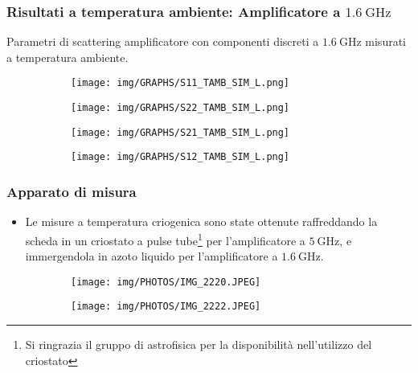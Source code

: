 \documentclass{beamer}
\begin{document}
\begin{frame}
    \frametitle{Risultati a temperatura ambiente: Amplificatore a $\SI{1.6}{\giga\hertz}$}
    Parametri di scattering amplificatore con componenti discreti a $\SI{1.6}{\giga\hertz}$ misurati a temperatura ambiente.
    \begin{figure}[!htbp]
        \centering
        
        \begin{subfigure}[t]{0.4\textwidth}
            \centering
            \texttt{[image: img/GRAPHS/S11\_TAMB\_SIM\_L.png]}
            
        \end{subfigure}
        \hfill
        \begin{subfigure}[t]{0.4\textwidth}
            \centering
            \texttt{[image: img/GRAPHS/S22\_TAMB\_SIM\_L.png]}
            
        \end{subfigure}
        \hfill
        \centering
        \begin{subfigure}[t]{0.4\textwidth}
            \centering
            \texttt{[image: img/GRAPHS/S21\_TAMB\_SIM\_L.png]}
            
        \end{subfigure}
        \hfill
        \begin{subfigure}[t]{0.4\textwidth}
            \centering
            \texttt{[image: img/GRAPHS/S12\_TAMB\_SIM\_L.png]}
            
        \end{subfigure}
    \end{figure}
\end{frame}

\begin{frame}
    \frametitle{Apparato di misura}
    \begin{itemize}
        \item Le misure a temperatura criogenica sono state ottenute raffreddando la scheda in un criostato a pulse tube\footnote{Si ringrazia il gruppo di astrofisica per la disponibilità nell'utilizzo del criostato} per l'amplificatore a $\SI{5}{\giga\hertz}$, e immergendola in azoto liquido per l'amplificatore a $\SI{1.6}{\giga\hertz}$.
    \end{itemize}
    
    \begin{figure}
        \centering
        \begin{subfigure}[t]{0.5\textwidth}
            \centering
            \texttt{[image: img/PHOTOS/IMG\_2220.JPEG]}
            
        \end{subfigure}
        \hfill
        \begin{subfigure}[t]{0.35\textwidth}
            \centering
            \texttt{[image: img/PHOTOS/IMG\_2222.JPEG]}
            
        \end{subfigure}
    \end{figure}
\end{frame}
\end{document}
